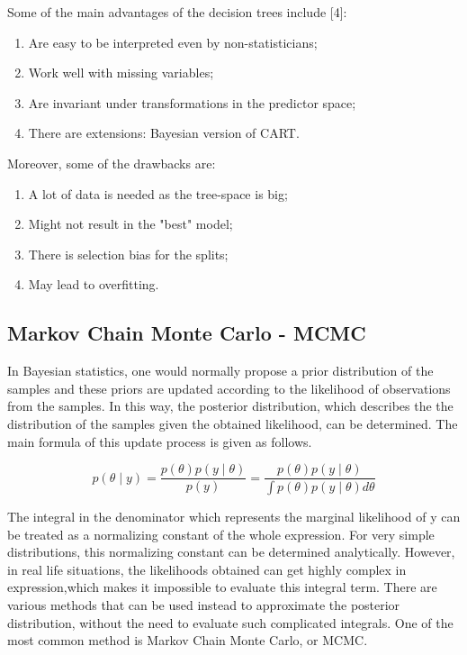 \documentclass{usiinftr}
\begin{document}
Some of the main advantages of the decision trees include [4]:
\begin{enumerate}
\item Are easy to be interpreted even by non-statisticians;
\item Work well with missing variables;
\item Are invariant under transformations in the predictor space;
\item There are extensions: Bayesian version of CART.
\end{enumerate}

Moreover, some of the drawbacks are:
\begin{enumerate}
\item A lot of data is needed as the tree-space is big;
\item Might not result in the "best" model;
\item There is selection bias for the splits;
\item May lead to overfitting.
\end{enumerate}

\subsection{Markov Chain Monte Carlo - MCMC}
In Bayesian statistics, one would normally propose a prior distribution of the samples and these priors are updated according to the likelihood of observations from the samples. In this way, the posterior distribution, which describes the the distribution of the samples given the obtained likelihood, can be determined. The main formula of this update process is given as follows.

\begin{equation} \label{Bayes}
p(\theta \mid y) = \frac{p(\theta)p(y \mid \theta)}{p(y)} = \frac{p(\theta)p(y \mid \theta)}{\int p(\theta)p(y \mid \theta) d\theta}
\end{equation}

The integral in the denominator which represents the marginal likelihood of y can be treated as a normalizing constant of the whole expression. For very simple distributions, this normalizing constant can be determined analytically. However, in real life situations, the likelihoods obtained can get highly complex in expression,which makes it impossible to evaluate this integral term. There are various methods that can be used instead to approximate the posterior distribution, without the need to evaluate such complicated integrals. One of the most common method is Markov Chain Monte Carlo, or MCMC.
\end{document}
